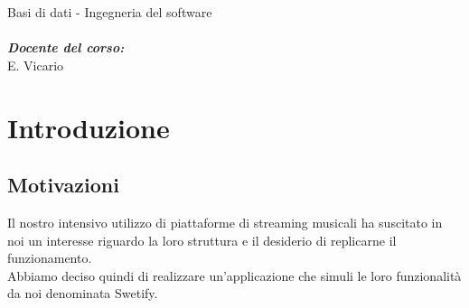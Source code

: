 \documentclass{article}
\begin{document}
\begin{titlepage}
\begin{center}
\begin{adjustwidth}{1cm}{}
\begin{flushleft}
\begin{minipage}[t]{0.45\textwidth}
            \hspace*{1.1cm} Basi di dati - Ingegneria del software \\
            \vspace{0.5cm} \\
            \hspace*{1.1cm} \textit{\textbf{Docente del corso:}} \\
            \hspace*{1.1cm} E. Vicario \\
          \end{minipage}
        \end{flushleft}
      \end{adjustwidth}
    \end{center}
  \end{titlepage}

  \renewcommand{\contentsname}{\LARGE Indice}
  \tableofcontents
  \pagebreak


  \section{Introduzione}

  \subsection{Motivazioni}
  Il nostro intensivo utilizzo di piattaforme di streaming musicali ha suscitato in noi un interesse riguardo
  la loro struttura e il desiderio di replicarne il funzionamento.\\
  Abbiamo deciso quindi di realizzare un'applicazione che simuli le loro funzionalità da noi denominata Swetify.
\end{document}

